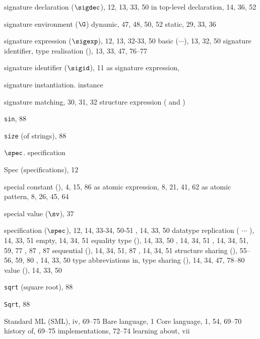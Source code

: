 \begin{theindex}
\item signature declaration ($\sigdec$), 12, 13, 33, 50
\subitem in top-level declaration, 14, 36, 52
\item signature environment ($\G$) 
\subitem dynamic, 47, 48, 50, 52
\subitem static, 29, 33, 36
\item signature expression ($\sigexp$), 12, 13, 32-33, 50
\subitem basic ($\cdots$), 13, 32, 50
\subitem signature identifier, \sigidrefs
\subitem type realisation (), 13, 33, 47, 76--77
\item signature identifier ($\sigid$), 11
\subitem as signature expression, \sigidrefs
\item signature instantiation. \see instance 
\item signature matching, 30, 31, 32
\subitem \seealso structure expression (\boxml{:} and \boxml{:>})
\item {\tt sin}, 88
\item {\tt size} (of strings), 88
\item $\spec$. \see specification
\item Spec (specifications), 12
\item special constant (\scon), 4, 15, 86
\subitem as atomic expression, 8, 21, 41, 62
\subitem as atomic pattern, 8, 26, 45, 64
\item special value ($\sv$), 37
\item specification ($\spec$), 12, 14, 33-34, 50-51
\subitem {}, 14, 33, 50
\subitem datatype replication ( $\cdots$ \linebreak
{}), 14, 33, 51
\subitem empty, 14, 34, 51
\subitem equality type (), 14, 33, 50
\subitem {}, 14, 34, 51
\subitem {}, 14, 34, 51, 59, 77
\subitem {}, 87
\subitem {}, 87
\subitem sequential (\boxml{;}), 14, 34, 51, 87
\subitem {}, 14, 34, 51
\subitem structure sharing (), 55--56, 59, 80
\subitem {}, 14, 33, 50
\subitem type abbreviations in, \typabbrinsigsrefs
\subitem type sharing (), 14, 34, 47, 78--80
\subitem value (), 14, 33, 50
\item {\tt sqrt} (square root), 88
\item {\tt Sqrt}, 88
\item Standard ML (SML), iv, 69--75
\subitem Bare language, 1
\subitem Core language, 1, 54, 69--70
\subitem history of, 69--75
\subitem implementations, 72--74
\subitem learning about, vii

\end{theindex}
